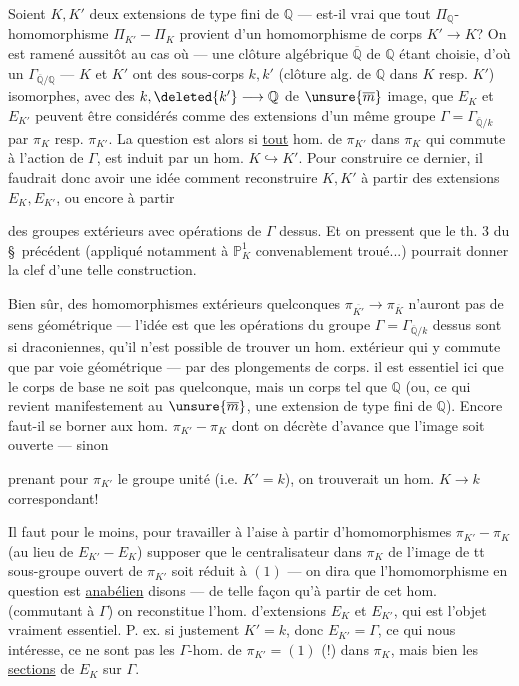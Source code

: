 Soient $K,K'$ deux extensions de type fini de $\mathbb Q$ --- est-il vrai que tout $\Pi_{\mathbb Q}$-homomorphisme $\Pi_{K'}-\Pi_K$ provient d'un homomorphisme de corps $K'\longrightarrow K$? On est ramené aussitôt au cas où --- une clôture algébrique $\overline{\mathbb Q}$ de $\mathbb Q$ étant choisie, d'où un $\Gamma_{\overline{\mathbb Q}/\mathbb Q}$ --- $K$ et $K'$ ont des sous-corps $k,k'$ (clôture alg. de $\mathbb Q$ dans $K$ resp. $K'$) isomorphes, avec des   $k,\deleted{k'}\longrightarrow\mathbb Q$ de $\unsure{\overline m}$ image,  que $E_K$ et $E_{K'}$ peuvent être considérés comme des extensions d'un même groupe $\Gamma=\Gamma_{\overline{\mathbb Q}/k}$ par $\pi_K$ resp. $\pi_{K'}$. La question est alors si \uline{tout} hom. de $\pi_{K'}$ dans $\pi_K$ qui commute à l'action de $\Gamma$, est induit par un hom. $K\hookrightarrow K'$. Pour construire ce dernier, il faudrait donc avoir une idée comment reconstruire $K,K'$ à partir des extensions $E_K,E_{K'}$, ou encore à partir

des groupes  extérieurs avec opérations de $\Gamma$ dessus. Et on pressent que le th. 3 du \S\ précédent (appliqué notamment à $\mathbb P_K^1$ convenablement troué...) pourrait donner la clef d'une telle construction.

Bien  sûr, des homomorphismes extérieurs quelconques $\pi_{\overline{K'}}\longrightarrow\pi_{\overline K}$ n'auront pas de sens géométrique --- l'idée est que les opérations du groupe $\Gamma=\Gamma_{\overline{\mathbb Q}/k}$ dessus sont si draconiennes, qu'il n'est possible de trouver un hom. extérieur qui y commute que par voie géométrique --- par des plongements de corps.  il est essentiel ici que le corps de base ne soit pas quelconque, mais un corps tel que $\mathbb Q$ (ou, ce qui revient manifestement au $\unsure{\overline m}$, une extension de type fini de $\mathbb Q$). Encore faut-il se borner aux hom. $\pi_{K'}-\pi_K$ dont on décrète d'avance que l'image soit ouverte --- sinon

prenant pour $\pi_{K'}$ le groupe unité (i.e. $K'=k$), on trouverait un hom. $K\longrightarrow k$ correspondant!

Il faut pour le moins, pour travailler à l'aise à partir d'homomorphismes $\pi_{K'}-\pi_K$ (au lieu de $E_{K'}-E_K$) supposer que le centralisateur dans $\pi_K$ de l'image de tt sous-groupe ouvert de $\pi_{K'}$ soit réduit à $(1)$ --- on dira que l'homomorphisme en question est \uline{anabélien} disons --- de telle façon qu'à partir de cet hom. (commutant à $\Gamma$) on reconstitue l'hom. d'extensions $E_K$ et $E_{K'}$, qui est l'objet vraiment essentiel. P. ex. si justement $K'=k$, donc $E_{K'}=\Gamma$, ce qui nous intéresse, ce ne sont pas les $\Gamma$-hom. de $\pi_{K'}=(1)$ (!) dans $\pi_K$, mais bien les \uline{sections} de $E_K$ sur $\Gamma$.

